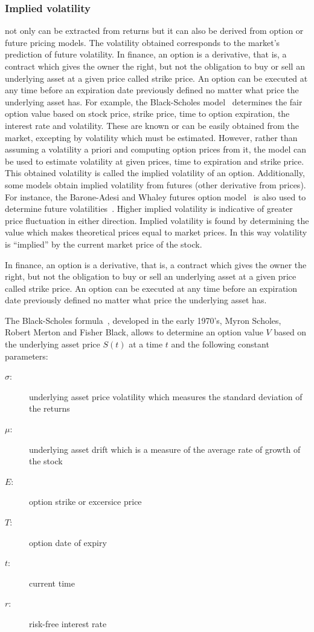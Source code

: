 \subsubsection{Implied volatility} not only can be extracted from returns
but it can also be derived from option or future pricing models.  The
volatility obtained corresponds to the market's prediction of future
volatility. In finance, an option is a derivative, that is, a contract which
gives the owner the right, but not the obligation to buy or sell an underlying
asset at a given price called strike price. An option can be executed at any
time before an expiration date previously defined no matter what price the
underlying asset has. For example, the Black-Scholes model~\cite{black1973}
determines the fair option value based on stock price, strike price, time to
option expiration, the interest rate and volatility. These are known or can be
easily obtained from the market, excepting by volatility which must be
estimated. However, rather than assuming a volatility a priori and computing
option prices from it, the model can be used to estimate volatility at given
prices, time to expiration and strike price. This obtained volatility is called
the implied volatility of an option. Additionally, some models obtain implied
volatility from futures (other derivative from prices). For instance, the
Barone-Adesi and Whaley futures option model~\cite{baroneetal1987} is also used
to determine future volatilities~\cite{hamidetal2004}. Higher implied
volatility is indicative of greater price fluctuation in either direction.
Implied volatility is found by determining the value which makes theoretical
prices equal to market prices. In this way volatility is ``implied'' by the
current market price of the stock.

In finance, an option is a derivative, that is, a contract which gives the owner
the right, but not the obligation to buy or sell an underlying asset at a given
price called strike price. An option can be executed at any time before an
expiration date previously defined no matter what price the underlying asset
has. 

The Black-Scholes formula~\cite{black1973}, developed in the early 1970's, Myron
Scholes, Robert Merton and Fisher Black,  allows to determine an option value
$V$ based on the underlying asset price $S(t)$ at a time $t$ and the following
constant parameters: 

\begin{description}
\item [$\sigma$:] underlying asset price volatility which measures the standard
deviation of the returns
\item [$\mu$:] underlying asset drift which is a measure of the average rate of
growth of the stock
\item[$E$:] option strike or excersice price
\item[$T$:] option date of expiry
\item[$t$:] current time
\item[$r$:] risk-free interest rate
\end{description}

